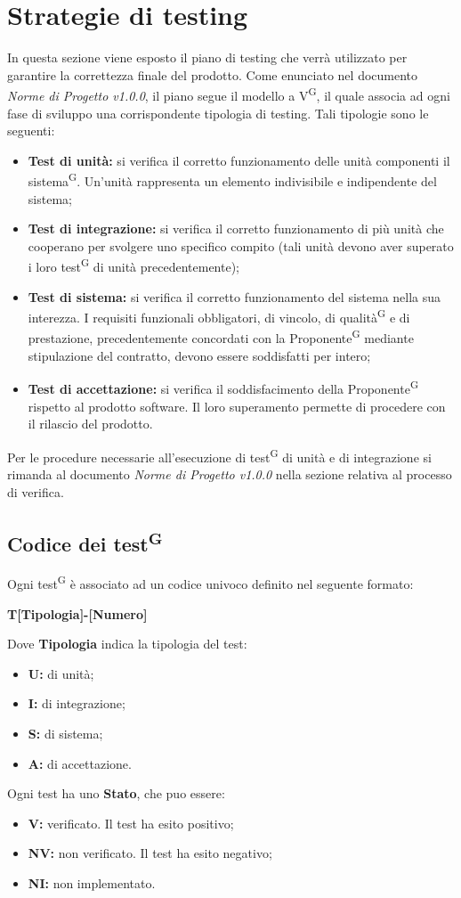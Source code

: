 \documentclass[8pt]{article}
\newcommand{\glossterm}[1]{#1\textsuperscript{G}} %
\begin{document}
\section{Strategie di testing}\label{sec:strategie testing}
In questa sezione viene esposto il piano di testing che verrà utilizzato per garantire la correttezza finale del prodotto. Come enunciato nel documento \textit{Norme di Progetto v1.0.0}, il piano segue il \glossterm{modello a V}, il quale associa ad ogni fase di sviluppo una corrispondente tipologia di testing. Tali tipologie sono le seguenti:
\begin{itemize}
	\item \textbf{Test di unità:} si verifica il corretto funzionamento delle unità componenti il \glossterm{sistema}. Un'unità rappresenta un elemento indivisibile e indipendente del sistema; 
	\item \textbf{Test di integrazione:} si verifica il corretto funzionamento di più unità che cooperano per svolgere uno specifico compito (tali unità devono aver superato i loro \glossterm{test} di unità precedentemente);
	\item \textbf{Test di sistema:} si verifica il corretto funzionamento del sistema nella sua interezza. I requisiti funzionali obbligatori, di vincolo, di \glossterm{qualità} e di prestazione, precedentemente concordati con la \glossterm{Proponente} mediante stipulazione del contratto, devono essere soddisfatti per intero;
	\item \textbf{Test di accettazione:} si verifica il soddisfacimento della \glossterm{Proponente} rispetto al prodotto software. Il loro superamento permette di procedere con il rilascio del prodotto.
\end{itemize}
Per le procedure necessarie all’esecuzione di \glossterm{test} di unità e di integrazione si rimanda al documento \textit{Norme di Progetto v1.0.0} nella sezione relativa al processo di verifica.
\subsection{Codice dei \glossterm{test}}
Ogni \glossterm{test} è associato ad un codice univoco definito nel seguente formato:
\begin{center}
	\textbf{T[Tipologia]-[Numero]}
\end{center}
Dove \textbf{Tipologia} indica la tipologia del test: 
\begin{itemize}
    \item \textbf{U:} di unit\`{a};
	\item \textbf{I:} di integrazione;
	\item \textbf{S:} di sistema;
	\item \textbf{A:} di accettazione.
\end{itemize}
Ogni test ha uno \textbf{Stato}, che puo essere:
\begin{itemize}
	\item \textbf{V:} verificato. Il test ha esito positivo;
	\item \textbf{NV:} non verificato. Il test ha esito negativo; 
	\item \textbf{NI:} non implementato.
\end{itemize}
\clearpage
\end{document}
